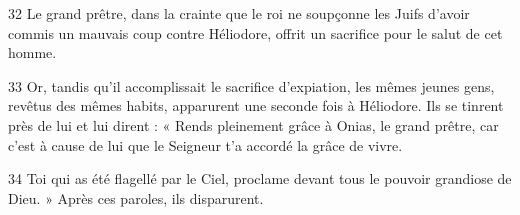 
32 Le grand prêtre, dans la crainte que le roi ne soupçonne les Juifs d’avoir commis un mauvais coup contre Héliodore, offrit un sacrifice pour le salut de cet homme.

33 Or, tandis qu’il accomplissait le sacrifice d’expiation, les mêmes jeunes gens, revêtus des mêmes habits, apparurent une seconde fois à Héliodore. Ils se tinrent près de lui et lui dirent : « Rends pleinement grâce à Onias, le grand prêtre, car c’est à cause de lui que le Seigneur t’a accordé la grâce de vivre.

34 Toi qui as été flagellé par le Ciel, proclame devant tous le pouvoir grandiose de Dieu. » Après ces paroles, ils disparurent.